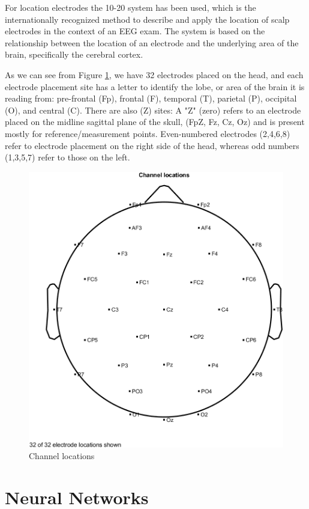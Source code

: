 \documentclass[12pt,a4paper,titlepage,openany]{report}
\begin{document}
For location electrodes the 10-20 system \cite{wikipedia1020} has been used, which is the internationally recognized method to describe and apply the location of scalp electrodes in the context of an EEG exam. The system is based on the relationship between the location of an electrode and the underlying area of the brain, specifically the cerebral cortex.

As we can see from Figure \ref{fig:channel-locations}, we have 32 electrodes placed on the head, and each electrode placement site has a letter to identify the lobe, or area of the brain it is reading from: pre-frontal (Fp), frontal (F), temporal (T), parietal (P), occipital (O), and central (C). There are also (Z) sites: A "Z" (zero) refers to an electrode placed on the midline sagittal plane of the skull, (FpZ, Fz, Cz, Oz) and is present mostly for reference/measurement points. Even-numbered electrodes (2,4,6,8) refer to electrode placement on the right side of the head, whereas odd numbers (1,3,5,7) refer to those on the left.

\begin{figure}[H]
     \centering
     \includegraphics[width=0.7\linewidth]{./misc/Channel locations.png}
     \caption{Channel locations}
     \label{fig:channel-locations}
\end{figure}

\section{Neural Networks}
\end{document}
